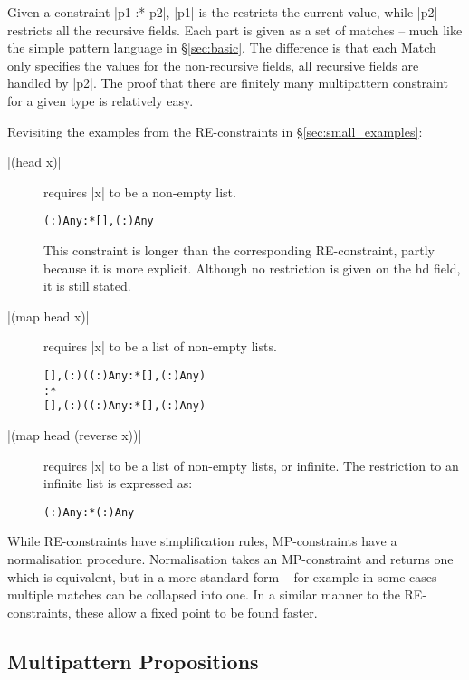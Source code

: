 \documentclass[preprint]{sigplanconf}
\newcommand{\C}[1]{\textsf{#1}}
\newenvironment{code}{\begin{alltt}\small}{\end{alltt}}
\begin{document}
Given a constraint |p1 :* p2|, |p1| is the restricts the current value, while |p2| restricts all the recursive fields. Each part is given as a set of matches -- much like the simple pattern language in \S\ref{sec:basic}. The difference is that each \C{Match} only specifies the values for the non-recursive fields, all recursive fields are handled by |p2|. The proof that there are finitely many multipattern constraint for a given type is relatively easy.

Revisiting the examples from the RE-constraints in \S\ref{sec:small_examples}:

\begin{description}
\item[|(head x)|] requires |x| to be a non-empty list.

    \begin{code}
    {(:) Any} :* {[], (:) Any}
    \end{code}

    This constraint is longer than the corresponding RE-constraint, partly because it is more explicit. Although no restriction is given on the \C{hd} field, it is still stated.

\item[|(map head x)|] requires |x| to be a list of non-empty lists.

    \begin{code}
    {[], (:) ({(:) Any} :* {[], (:) Any})}
    :*
    {[], (:) ({(:) Any} :* {[], (:) Any})}
    \end{code}

\item[|(map head (reverse x))|] requires |x| to be a list of non-empty lists, or infinite. The restriction to an infinite list is expressed as:

    \begin{code}
    {(:) Any} :* {(:) Any}
    \end{code}
\end{description}

While RE-constraints have simplification rules, MP-constraints have a normalisation procedure. Normalisation takes an MP-constraint and returns one which is equivalent, but in a more standard form -- for example in some cases multiple matches can be collapsed into one. In a similar manner to the RE-constraints, these allow a fixed point to be found faster.

\subsection{Multipattern Propositions}
\end{document}
